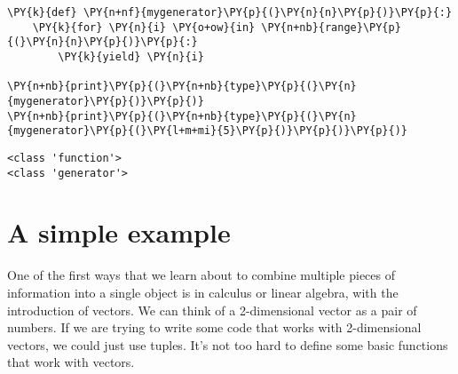 \begin{Verbatim}[commandchars=\\\{\}]
\PY{k}{def} \PY{n+nf}{mygenerator}\PY{p}{(}\PY{n}{n}\PY{p}{)}\PY{p}{:}
    \PY{k}{for} \PY{n}{i} \PY{o+ow}{in} \PY{n+nb}{range}\PY{p}{(}\PY{n}{n}\PY{p}{)}\PY{p}{:}
        \PY{k}{yield} \PY{n}{i}

\PY{n+nb}{print}\PY{p}{(}\PY{n+nb}{type}\PY{p}{(}\PY{n}{mygenerator}\PY{p}{)}\PY{p}{)}
\PY{n+nb}{print}\PY{p}{(}\PY{n+nb}{type}\PY{p}{(}\PY{n}{mygenerator}\PY{p}{(}\PY{l+m+mi}{5}\PY{p}{)}\PY{p}{)}\PY{p}{)}
\end{Verbatim}

\begin{Verbatim}
<class 'function'>
<class 'generator'>
\end{Verbatim}

\section{A simple example}


One of the first ways that we learn about to combine multiple pieces of information into a single object is in calculus or linear algebra, with the introduction of vectors.  We can think of a 2-dimensional vector as a pair of numbers.  If we are trying to write some code that works with 2-dimensional vectors, we could just use tuples.  It's not too hard to define some basic functions that work with vectors.


